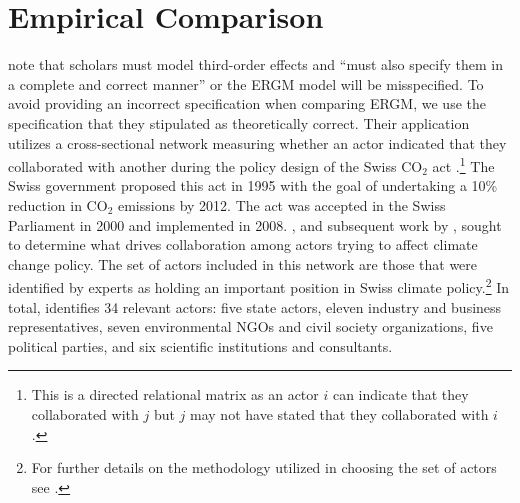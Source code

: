 \documentclass[12pt,pdflatex]{elsarticle}
\begin{document}
\section{\textbf{Empirical Comparison}} 


\citet[p. 8]{cranmer:etal:2016} note that scholars must model third-order effects and ``must also specify them in a complete and correct manner'' or the ERGM model will be misspecified. To avoid providing an incorrect specification when comparing ERGM, we use the specification that they stipulated as theoretically correct. Their application utilizes a cross-sectional network measuring whether an actor indicated that they collaborated with another during the policy design of the Swiss CO$_{2}$ act \citep{ingold:2008}.\footnote{This is a directed relational matrix as an actor $i$ can indicate that they collaborated with $j$ but $j$ may not have stated that they collaborated with $i$.} The Swiss government proposed this act in 1995 with the goal of undertaking a 10\% reduction in CO$_{2}$ emissions by 2012. The act was accepted in the Swiss Parliament in 2000 and implemented in 2008. \citet{ingold:2008}, and subsequent work by \citet{ingold:fischer:2014}, sought to determine what drives collaboration among actors trying to affect climate change policy. The set of actors included in this network are those that were identified by experts as holding an important position in Swiss climate policy.\footnote{For further details on the methodology utilized in choosing the set of actors see \citet{ingold:2008,ingold:fischer:2014}.} In total, \citet{ingold:2008} identifies 34 relevant actors: five state actors, eleven industry and business representatives, seven environmental NGOs and civil society organizations, five political parties, and six scientific institutions and consultants. 
\end{document}

